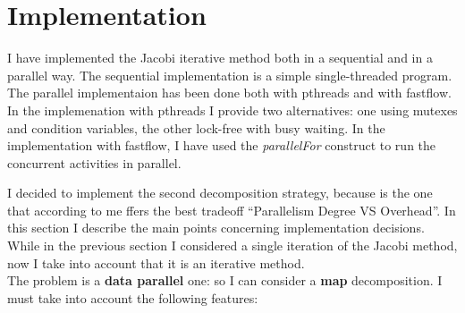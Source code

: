 \documentclass{article}
\begin{document}
\section{Implementation} 
I have implemented the Jacobi iterative method both in a sequential and in a parallel way. The sequential implementation is a simple single-threaded program. The parallel implementaion has been done both with pthreads and with fastflow. In the implemenation with pthreads I provide two alternatives: one using mutexes and condition variables, the other lock-free with busy waiting. In the implementation with fastflow, I have used the \textit{parallelFor} construct to run the concurrent activities in parallel.


I decided to implement the second decomposition strategy, because is the one that according to me ffers the best tradeoff ``Parallelism Degree VS Overhead''. In this section I describe the main points concerning implementation decisions. While in the previous section I considered a single iteration of the Jacobi method, now I take into account that it is an iterative method. \\
The problem is a \textbf{data parallel} one: so I can consider a \textbf{map} decomposition. I must take into account the following features:
\end{document}
